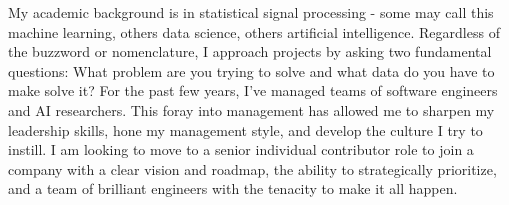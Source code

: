 

\begin{cvparagraph}

  My academic background is in statistical signal processing - some may call this machine
  learning, others data science, others artificial intelligence. Regardless of the
  buzzword or nomenclature, I approach projects by asking two fundamental questions: What
  problem are you trying to solve and what data do you have to make solve it? For the past
  few years, I've managed teams of software engineers and AI researchers. This foray into
  management has allowed me to sharpen my leadership skills, hone my management style, and
  develop the culture I try to instill. I am looking to move to a senior individual
  contributor role to join a company with a clear vision and roadmap,
  the ability to strategically prioritize, and a team of brilliant engineers with the
  tenacity to make it all happen.
\end{cvparagraph}



